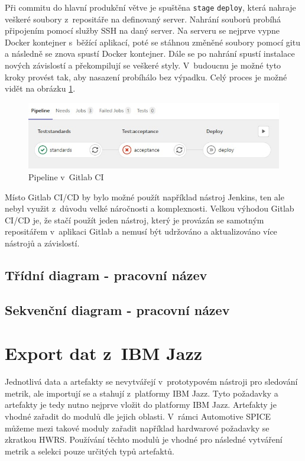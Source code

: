 \documentclass[czech,master]{diploma}
\begin{document}
Při commitu do hlavní produkční větve je spuštěna \texttt{stage} \texttt{deploy}, která nahraje veškeré soubory z~repositáře na definovaný server. Nahrání souborů probíhá připojením pomocí služby SSH na daný server. Na serveru se nejprve vypne Docker kontejner s~běžící aplikací, poté se stáhnou změněné soubory pomocí gitu a následně se znova spustí Docker kontejner. Dále se po nahrání spustí instalace nových závislostí a překompilují se veškeré styly. V~budoucnu je možné tyto kroky provést tak, aby nasazení probíhálo bez výpadku. Celý proces je možné vidět na obrázku \ref{fig:gitlab_ci}.

\begin{figure}[!ht]
    \centering
    \includegraphics[width=1\textwidth]{Diplomka/Figures/gitlab_ci.jpg}
    \caption{Pipeline v~Gitlab CI}
    \label{fig:gitlab_ci}
\end{figure}

Místo Gitlab CI/CD by bylo možné použít například nástroj Jenkins, ten ale nebyl využit z~důvodu velké náročnosti a komplexnosti. Velkou výhodou Gitlab CI/CD je, že stačí použít jeden nástroj, který je provázán se samotným repositářem v~aplikaci Gitlab a nemusí být udržováno a aktualizováno více nástrojů a závislostí.


\subsection{Třídní diagram - pracovní název}

\subsection{Sekvenční diagram - pracovní název}

\section{Export dat z~IBM Jazz}
\label{sec:ibm_export}

Jednotlivá data a artefakty se nevytvářejí v~prototypovém nástroji pro sledování metrik, ale importují se a stahují z~platformy IBM Jazz. Tyto požadavky a artefakty je tedy nutno nejprve vložit do platformy IBM Jazz. Artefakty je vhodné zařadit do modulů dle jejich oblasti. V~rámci Automotive SPICE můžeme mezi takové moduly zařadit například hardwarové požadavky se zkratkou HWRS. Používání těchto modulů je vhodné pro následné vytváření metrik a selekci pouze určitých typů artefaktů.
\end{document}
